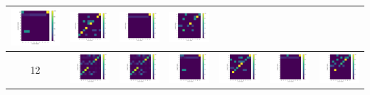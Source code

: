 \begin{tabular}{ |c|c|c|c|c|c|c| }
        \includegraphics[width=0.13\linewidth]{../results/11-clusters/accuracy - test 2.png} &
        \includegraphics[width=0.13\linewidth]{../results/11-clusters/accuracy - test 2 preprocessed.png} &
        \includegraphics[width=0.13\linewidth]{../results/11-clusters/accuracy - test 3.png} &
        \includegraphics[width=0.13\linewidth]{../results/11-clusters/accuracy - test 3 preprocessed.png} \\
    \hline
        12 & 
        \includegraphics[width=0.13\linewidth]{../results/12-clusters/accuracy - train.png} &
        \includegraphics[width=0.13\linewidth]{../results/12-clusters/accuracy - test 1.png} &
        \includegraphics[width=0.13\linewidth]{../results/12-clusters/accuracy - test 2.png} &
        \includegraphics[width=0.13\linewidth]{../results/12-clusters/accuracy - test 2 preprocessed.png} &
        \includegraphics[width=0.13\linewidth]{../results/12-clusters/accuracy - test 3.png} &
        \includegraphics[width=0.13\linewidth]{../results/12-clusters/accuracy - test 3 preprocessed.png} \\
    \hline
\end{tabular}

